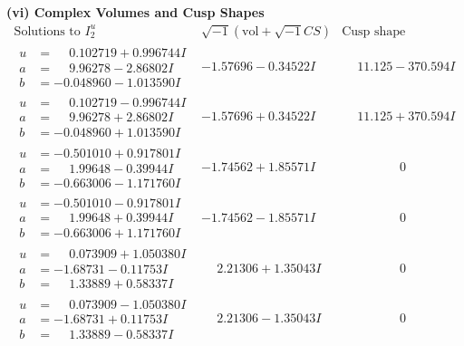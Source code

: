 \documentclass[1p]{elsarticle_modified}
\theoremstyle{definition}
\newcommand{\I}{\sqrt{-1}}
\begin{document}
\newpage\flushleft \textbf{(vi) Complex Volumes and Cusp Shapes}
$$\begin{array}{c|c|c}  
\text{Solutions to }I^u_{2}& \I (\text{vol} + \sqrt{-1}CS) & \text{Cusp shape}\\
 \hline 
\begin{aligned}
u &= \phantom{-}0.102719 + 0.996744 I \\
a &= \phantom{-}9.96278 - 2.86802 I \\
b &= -0.048960 - 1.013590 I\end{aligned}
 & -1.57696 - 0.34522 I & \phantom{-}11.125 - 370.594 I \\ \hline\begin{aligned}
u &= \phantom{-}0.102719 - 0.996744 I \\
a &= \phantom{-}9.96278 + 2.86802 I \\
b &= -0.048960 + 1.013590 I\end{aligned}
 & -1.57696 + 0.34522 I & \phantom{-}11.125 + 370.594 I \\ \hline\begin{aligned}
u &= -0.501010 + 0.917801 I \\
a &= \phantom{-}1.99648 - 0.39944 I \\
b &= -0.663006 - 1.171760 I\end{aligned}
 & -1.74562 + 1.85571 I & \phantom{-0.000000 } 0 \\ \hline\begin{aligned}
u &= -0.501010 - 0.917801 I \\
a &= \phantom{-}1.99648 + 0.39944 I \\
b &= -0.663006 + 1.171760 I\end{aligned}
 & -1.74562 - 1.85571 I & \phantom{-0.000000 } 0 \\ \hline\begin{aligned}
u &= \phantom{-}0.073909 + 1.050380 I \\
a &= -1.68731 - 0.11753 I \\
b &= \phantom{-}1.33889 + 0.58337 I\end{aligned}
 & \phantom{-}2.21306 + 1.35043 I & \phantom{-0.000000 } 0 \\ \hline\begin{aligned}
u &= \phantom{-}0.073909 - 1.050380 I \\
a &= -1.68731 + 0.11753 I \\
b &= \phantom{-}1.33889 - 0.58337 I\end{aligned}
 & \phantom{-}2.21306 - 1.35043 I & \phantom{-0.000000 } 0 \\ \hline\begin{aligned}

\end{aligned}
\end{array}$$
\end{document}
